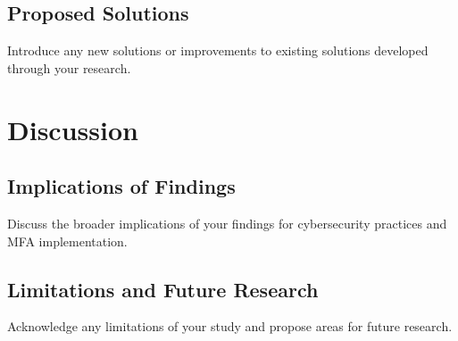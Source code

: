 \documentclass[12pt]{report}
\begin{document}
\section{Proposed Solutions}
Introduce any new solutions or improvements to existing solutions developed through
your research.

\chapter{Discussion}
\section{Implications of Findings}
Discuss the broader implications of your findings for cybersecurity practices and
MFA implementation.

\section{Limitations and Future Research}
Acknowledge any limitations of your study and propose areas for future research.

\newpage


\end{document}
